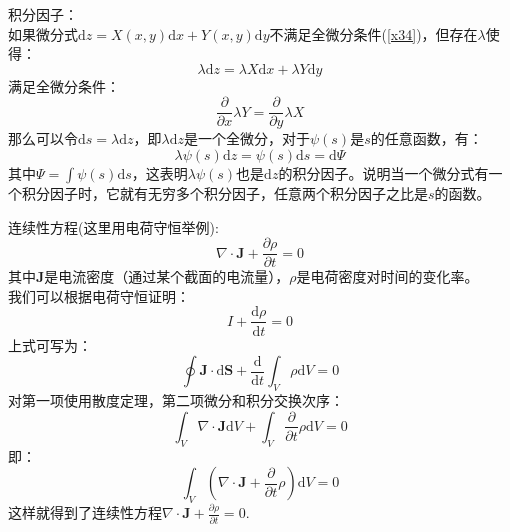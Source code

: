 \documentclass[12pt]{article}
\begin{document}
积分因子：\\
如果微分式$\mathrm{d}z=X(x,y)\mathrm{d}x+Y(x,y)\mathrm{d}y$不满足全微分条件(\ref{x34})，但存在$\lambda$使得：
\begin{equation}
	\lambda \mathrm{d}z=\lambda X\mathrm{d}x+\lambda Y\mathrm{d}y
\end{equation}
满足全微分条件：
\begin{equation}
	\frac{\partial}{\partial x}\lambda Y=\frac{\partial }{\partial y} \lambda X
\end{equation}
那么可以令$\mathrm{d}s=\lambda\mathrm{d}z$，即$\lambda \mathrm{d}z$是一个全微分，对于$\psi(s)$是$s$的任意函数，有：
\begin{equation}
	\lambda \psi (s)\mathrm{d}z=\psi(s)\mathrm{d}s=\mathrm{d}\Psi
\end{equation}
其中$\Psi=\int \psi(s)\mathrm{d}s$，这表明$\lambda \psi(s)$也是$\mathrm{d}z$的积分因子。说明当一个微分式有一个积分因子时，它就有无穷多个积分因子，任意两个积分因子之比是$s$的函数。

连续性方程(这里用电荷守恒举例):
\begin{equation}
	\nabla \cdot \mathbf{J}+\frac{\partial \rho}{\partial t}=0
	\label{x35}
\end{equation}
其中$\mathbf{J}$是电流密度（通过某个截面的电流量），$\rho$是电荷密度对时间的变化率。\\
我们可以根据电荷守恒证明：
\begin{equation}
	I+\frac{\mathrm{d}\rho}{\mathrm{d} t}=0
\end{equation}
上式可写为：
\begin{equation}
	\oint \mathbf{J}\cdot \mathrm{d}\mathbf{S}+\frac{\mathrm{d}}{\mathrm{d}t}\int_{V}\rho \mathrm{d}V=0
\end{equation}
对第一项使用散度定理，第二项微分和积分交换次序：
\begin{equation}
	\int_V \nabla\cdot \mathbf{J}\mathrm{d}V+\int_V\frac{\partial}{\partial t}\rho\mathrm{d}V=0
\end{equation}
即：
\begin{equation}
	\int_V (\nabla \cdot \mathbf{J}+\frac{\partial }{\partial t}\rho)\mathrm{d}V=0
\end{equation}
这样就得到了连续性方程$\nabla \cdot \mathbf{J}+\frac{\partial \rho}{\partial t}=0$.
\end{document}
